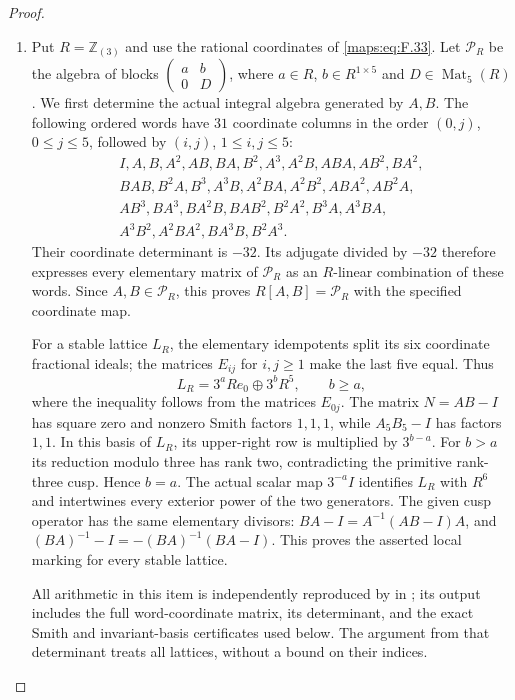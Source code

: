 \begin{proof}
\begin{enumerate}[label=\arabic*.]
\item Put $R=\mathbb Z_{(3)}$ and use the rational coordinates of
\eqref{maps:eq:F.33}.  Let $\mathcal P_R$ be the algebra of blocks
$\left(\begin{smallmatrix}a&b\\0&D\end{smallmatrix}\right)$,
where $a\in R$, $b\in R^{1\times5}$ and $D\in\operatorname{Mat}_5(R)$.
We first determine the actual integral algebra generated by $A,B$.
The following ordered words have $31$ coordinate columns in the order
$(0,j)$, $0\leq j\leq5$, followed by $(i,j)$,
$1\leq i,j\leq5$:
\[
\begin{gathered}
I,A,B,A^2,AB,BA,B^2,A^3,A^2B,ABA,AB^2,BA^2,\\
BAB,B^2A,B^3,A^3B,A^2BA,A^2B^2,ABA^2,AB^2A,\\
AB^3,BA^3,BA^2B,BAB^2,B^2A^2,B^3A,A^3BA,\\
A^3B^2,A^2BA^2,BA^3B,B^2A^3.
\end{gathered}
\]
Their coordinate determinant is $-32$.  Its adjugate divided by
$-32$ therefore expresses every elementary matrix of
$\mathcal P_R$ as an $R$-linear combination of these words.
Since $A,B\in\mathcal P_R$, this proves
$R[A,B]=\mathcal P_R$ with the specified coordinate map.

For a stable lattice $L_R$, the elementary idempotents split its
six coordinate fractional ideals; the matrices $E_{ij}$ for
$i,j\geq1$ make the last five equal.  Thus
\[
 L_R=3^aRe_0\oplus3^bR^5,\qquad b\geq a,
\]
where the inequality follows from the matrices $E_{0j}$.
The matrix $N=AB-I$ has square zero and nonzero Smith factors
$1,1,1$, while $A_5B_5-I$ has factors $1,1$.
In this basis of $L_R$, its upper-right row is multiplied by
$3^{b-a}$.  For $b>a$ its reduction modulo three has rank two,
contradicting the primitive rank-three cusp.  Hence $b=a$.
The actual scalar map $3^{-a}I$ identifies $L_R$ with $R^6$
and intertwines every exterior power of the two generators.
The given cusp operator has the same elementary divisors:
$BA-I=A^{-1}(AB-I)A$, and
$(BA)^{-1}-I=-(BA)^{-1}(BA-I)$.
This proves the asserted local marking for every stable lattice.

All arithmetic in this item is independently reproduced by
 in ;
its output includes the full word-coordinate matrix, its determinant,
and the exact Smith and invariant-basis certificates used below.
The argument from that determinant treats all lattices, without a
bound on their indices.


\end{enumerate}
\end{proof}

